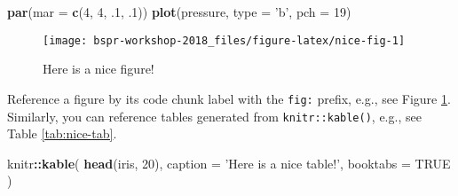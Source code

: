 \documentclass[12pt,]{book}
\newenvironment{Shaded}{\begin{snugshade}}{\end{snugshade}}
\newcommand{\KeywordTok}[1]{\textcolor[rgb]{0.13,0.29,0.53}{\textbf{#1}}}
\newcommand{\DataTypeTok}[1]{\textcolor[rgb]{0.13,0.29,0.53}{#1}}
\newcommand{\DecValTok}[1]{\textcolor[rgb]{0.00,0.00,0.81}{#1}}
\newcommand{\StringTok}[1]{\textcolor[rgb]{0.31,0.60,0.02}{#1}}
\newcommand{\OtherTok}[1]{\textcolor[rgb]{0.56,0.35,0.01}{#1}}
\newcommand{\OperatorTok}[1]{\textcolor[rgb]{0.81,0.36,0.00}{\textbf{#1}}}
\newcommand{\NormalTok}[1]{#1}
\theoremstyle{definition}
\theoremstyle{definition}
\theoremstyle{definition}
\theoremstyle{remark}
\begin{document}
\begin{Shaded}
\begin{Highlighting}[]
\KeywordTok{par}\NormalTok{(}\DataTypeTok{mar =} \KeywordTok{c}\NormalTok{(}\DecValTok{4}\NormalTok{, }\DecValTok{4}\NormalTok{, .}\DecValTok{1}\NormalTok{, .}\DecValTok{1}\NormalTok{))}
\KeywordTok{plot}\NormalTok{(pressure, }\DataTypeTok{type =} \StringTok{'b'}\NormalTok{, }\DataTypeTok{pch =} \DecValTok{19}\NormalTok{)}
\end{Highlighting}
\end{Shaded}

\begin{figure}

{\centering \texttt{[image: bspr-workshop-2018\_files/figure-latex/nice-fig-1]} 

}

\caption{Here is a nice figure!}\label{fig:nice-fig}
\end{figure}

Reference a figure by its code chunk label with the \texttt{fig:}
prefix, e.g., see Figure \ref{fig:nice-fig}. Similarly, you can
reference tables generated from \texttt{knitr::kable()}, e.g., see Table
\ref{tab:nice-tab}.

\begin{Shaded}
\begin{Highlighting}[]
\NormalTok{knitr}\OperatorTok{::}\KeywordTok{kable}\NormalTok{(}
  \KeywordTok{head}\NormalTok{(iris, }\DecValTok{20}\NormalTok{), }\DataTypeTok{caption =} \StringTok{'Here is a nice table!'}\NormalTok{,}
  \DataTypeTok{booktabs =} \OtherTok{TRUE}
\NormalTok{)}
\end{Highlighting}
\end{Shaded}
\end{document}
